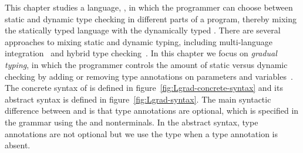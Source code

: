 \documentclass[7x10]{TimesAPriori_MIT}%
\numberwithin{theorem}{chapter}
\numberwithin{definition}{chapter}
\numberwithin{equation}{chapter}
\begin{document}
This chapter studies a language, \LangGrad{}, in which the programmer
can choose between static and dynamic type checking in different parts
of a program, thereby mixing the statically typed \LangLam{} language
with the dynamically typed \LangDyn{}. There are several approaches to
mixing static and dynamic typing, including multi-language
integration~\citep{Tobin-Hochstadt:2006fk,Matthews:2007zr} and hybrid
type checking~\citep{Flanagan:2006mn,Gronski:2006uq}. In this chapter
we focus on \emph{gradual typing}, in which the
programmer controls the amount of static versus dynamic checking by
adding or removing type annotations on parameters and
variables~\citep{Anderson:2002kd,Siek:2006bh}.
%
The concrete syntax of \LangGrad{} is defined in
figure~\ref{fig:Lgrad-concrete-syntax} and its abstract syntax is
defined in figure~\ref{fig:Lgrad-syntax}. The main syntactic
difference between \LangLam{} and \LangGrad{} is that type annotations
are optional, which is specified in the grammar using the \Param{} and
 nonterminals. In the abstract syntax, type annotations are
not optional but we use the \CANYTY{} type when a type annotation is
absent.

\newcommand{\LgradGrammarRacket}{
\begin{array}{lcl}
  \Type &::=& (\Type \ldots \; \key{->}\; \Type) \\
  \Param &::=& \Var \MID \LS\Var \key{:} \Type\RS \\
  \itm{ret} &::=& \epsilon \MID \key{:} \Type \\
  \Exp &::=& \LP\Exp \; \Exp \ldots\RP 
      \MID \CGLAMBDA{\LP\Param\ldots\RP}{\itm{ret}}{\Exp} \\
    &\MID& \LP \key{procedure-arity}~\Exp\RP \\
  \Def &::=& \CGDEF{\Var}{\Param\ldots}{\itm{ret}}{\Exp} 
\end{array}
}

\newcommand{\LgradASTRacket}{
\begin{array}{lcl}
  \Type &::=& (\Type \ldots \; \key{->}\; \Type) \\
  \Param &::=& \Var \MID \LS\Var \key{:} \Type\RS \\
  \Exp &::=& \APPLY{\Exp}{\Exp\ldots}
  \MID \LAMBDA{\LP\Param\ldots\RP}{\Type}{\Exp} \\
  \itm{op} &::=& \code{procedure-arity} \\
 \Def &::=& \FUNDEF{\Var}{\LP\Param\ldots\RP}{\Type}{\code{'()}}{\Exp} 
\end{array}
}
\end{document}
